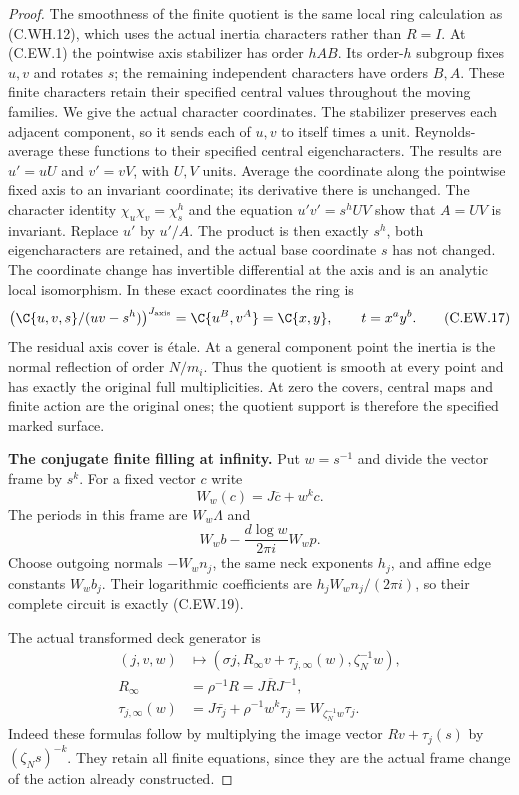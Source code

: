 \begin{proof}
The smoothness of the finite quotient is the same
local ring calculation as (C.WH.12), which uses
the actual inertia characters rather than $R=I$.
At (C.EW.1) the pointwise axis stabilizer has order
$hAB$. Its order-$h$ subgroup fixes $u,v$ and rotates
$s$; the remaining independent characters have
orders $B,A$. These finite characters retain their
specified central values throughout the moving
families. We give the actual character coordinates.
The stabilizer preserves each adjacent component,
so it sends each of $u,v$ to itself times a unit.
Reynolds-average these functions to their specified
central eigencharacters. The results are $u'=uU$
and $v'=vV$, with $U,V$ units. Average the coordinate
along the pointwise fixed axis to an invariant
coordinate; its derivative there is unchanged.
The character identity
$\chi_u\chi_v=\chi_s^h$ and the equation
$u'v'=s^hUV$ show that $A=UV$ is invariant.
Replace $u'$ by $u'/A$. The product is then exactly
$s^h$, both eigencharacters are retained, and the
actual base coordinate $s$ has not changed. The
coordinate change has invertible differential at
the axis and is an analytic local isomorphism.
In these exact coordinates the ring is
\[
 \bigl(\C\{u,v,s\}/(uv-s^h)\bigr)^{J_{\rm axis}}
                         =\C\{u^B,v^A\}
                         =\C\{x,y\},
 \qquad t=x^a y^b.
\tag{C.EW.17}
\]
The residual axis cover is \'{e}tale. At a general
component point the inertia is the normal reflection
of order $N/m_i$. Thus the quotient is smooth at
every point and has exactly the original full
multiplicities. At zero the covers, central maps and
finite action are the original ones; the quotient
support is therefore the specified marked surface.

\par\medskip\noindent\textbf{The conjugate finite filling at infinity.}
Put $w=s^{-1}$ and divide the vector frame by $s^k$.
For a fixed vector $c$ write
\[
 W_w(c)=J\overline c+w^k c.
\tag{C.EW.18}
\]
The periods in this frame are $W_w\Lambda$ and
\[
                    W_wb-\frac{d\log w}{2\pi i}W_wp.
\tag{C.EW.19}
\]
Choose outgoing normals $-W_wn_j$, the same neck
exponents $h_j$, and affine edge constants $W_wb_j$.
Their logarithmic coefficients are
$h_jW_wn_j/(2\pi i)$, so their complete circuit is
exactly (C.EW.19).

The actual transformed deck generator is
\[
 \begin{aligned}
 (j,v,w)&\longmapsto
     (\sigma j,R_\infty v+\tau_{j,\infty}(w),\zeta_N^{-1}w),\\
 R_\infty&=\rho^{-1}R=J\overline R J^{-1},\\
 \tau_{j,\infty}(w)
     &=J\overline{\tau_j}+\rho^{-1}w^k\tau_j
       =W_{\zeta_N^{-1}w}\tau_j.
 \end{aligned}
\tag{C.EW.20}
\]
Indeed these formulas follow by multiplying the image
vector $Rv+\tau_j(s)$ by $(\zeta_Ns)^{-k}$.
They retain all finite equations, since they are the
actual frame change of the action already constructed.


\end{proof}
